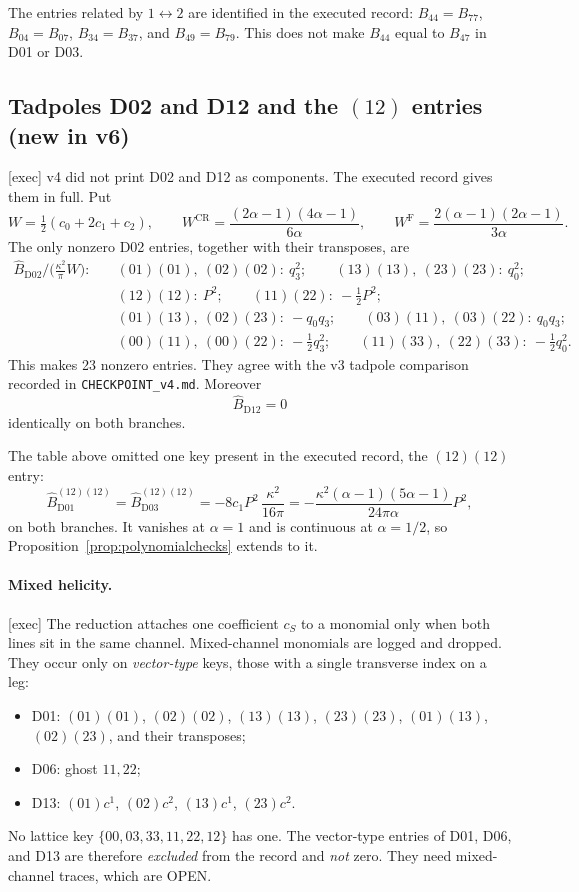 \documentclass[11pt,a4paper]{article}
\newcommand{\ka}{\kappa}
\newcommand{\Fr}{\mathrm F}
\newcommand{\CR}{\mathrm{CR}}
\newcommand{\loc}[1]{\nolinkurl{#1}}
\newcommand{\OPEN}{\textsf{OPEN}}
\theoremstyle{plain}
\theoremstyle{definition}
\theoremstyle{remark}
\numberwithin{equation}{section}
\begin{document}
The entries related by \(1\leftrightarrow2\) are identified in the
executed record:
\(B_{44}=B_{77}\), \(B_{04}=B_{07}\),
\(B_{34}=B_{37}\), and \(B_{49}=B_{79}\).
This does not make \(B_{44}\) equal to \(B_{47}\) in D01 or D03.

\subsection{Tadpoles D02 and D12 and the \texorpdfstring{\((12)\)}{(12)} entries (new in v6)}

\textsf{[exec]} v4 did not print D02 and D12 as components.
The executed record gives them in full.
Put
\[
W=\tfrac12(c_0+2c_1+c_2),\qquad
W^\CR=\frac{(2\alpha-1)(4\alpha-1)}{6\alpha},\qquad
W^\Fr=\frac{2(\alpha-1)(2\alpha-1)}{3\alpha}.
\]
The only nonzero D02 entries, together with their transposes, are
\begin{align*}
\widehat B_{\mathrm{D02}}\big/\bigl(\tfrac{\ka^2}{\pi}W\bigr):\quad
&(01)(01),\ (02)(02):\ q_3^2;\qquad
(13)(13),\ (23)(23):\ q_0^2;\\
&(12)(12):\ P^2;\qquad (11)(22):\ -\tfrac12P^2;\\
&(01)(13),\ (02)(23):\ -q_0q_3;\qquad
(03)(11),\ (03)(22):\ q_0q_3;\\
&(00)(11),\ (00)(22):\ -\tfrac12q_3^2;\qquad
(11)(33),\ (22)(33):\ -\tfrac12q_0^2.
\end{align*}
This makes 23 nonzero entries.
They agree with the v3 tadpole comparison recorded in
\loc{CHECKPOINT_v4.md}.
Moreover
\[
\widehat B_{\mathrm{D12}}=0
\]
identically on both branches.

The table above omitted one key present in the executed record,
the \((12)(12)\) entry:
\[
\widehat B_{\mathrm{D01}}^{(12)(12)}
=\widehat B_{\mathrm{D03}}^{(12)(12)}
=-8c_1P^2\,\frac{\ka^2}{16\pi}
=-\frac{\ka^2(\alpha-1)(5\alpha-1)}{24\pi\alpha}P^2,
\]
on both branches.
It vanishes at \(\alpha=1\) and is continuous at \(\alpha=1/2\), so
Proposition~\ref{prop:polynomialchecks} extends to it.

\paragraph{Mixed helicity.}
\textsf{[exec]} The reduction attaches one coefficient \(c_S\) to a
monomial only when both lines sit in the same channel.
Mixed-channel monomials are logged and dropped.
They occur only on \emph{vector-type} keys, those with a single
transverse index on a leg:
\begin{itemize}
\item D01: \((01)(01)\), \((02)(02)\), \((13)(13)\), \((23)(23)\),
\((01)(13)\), \((02)(23)\), and their transposes;
\item D06: ghost \(11,22\);
\item D13: \((01)c^1\), \((02)c^2\), \((13)c^1\), \((23)c^2\).
\end{itemize}
No lattice key \(\{00,03,33,11,22,12\}\) has one.
The vector-type entries of D01, D06, and D13 are therefore
\emph{excluded} from the record and \emph{not} zero.
They need mixed-channel traces, which are \OPEN.
\end{document}
